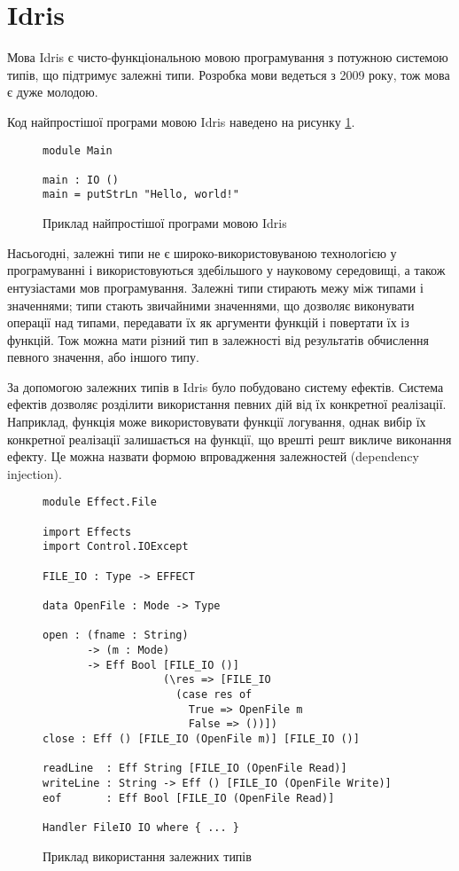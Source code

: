 \documentclass[main.tex]{subfiles}
\begin{document}
\section{Idris}\label{sec:idris}

Мова Idris\cite{idris} є чисто-функціональною мовою програмування з потужною системою типів, що підтримує залежні типи. Розробка мови ведеться з 2009 року\cite{idris:first-release}, тож мова є дуже молодою.

Код найпростішої програми мовою Idris наведено на рисунку \ref{example:idris}.

\begin{figure}[h]
  \centering
  \begin{BVerbatim}
module Main

main : IO ()
main = putStrLn "Hello, world!"
  \end{BVerbatim}
  \caption{Приклад найпростішої програми мовою Idris}\label{example:idris}
\end{figure}

Насьогодні, залежні типи не є широко-використовуваною технологією у програмуванні і використовуються здебільшого у науковому середовищі, а також ентузіастами мов програмування. Залежні типи стирають межу між типами і значеннями; типи стають звичайними значеннями, що дозволяє виконувати операції над типами, передавати їх як аргументи функцій і повертати їх із функцій. Тож можна мати різний тип в залежності від результатів обчислення певного значення, або іншого типу.

За допомогою залежних типів в Idris було побудовано систему ефектів. Система ефектів дозволяє розділити використання певних дій від їх конкретної реалізації. Наприклад, функція може використовувати функції логування, однак вибір їх конкретної реалізації залишається на функції, що врешті решт викличе виконання ефекту. Це можна назвати формою впровадження залежностей (dependency injection). 

\begin{figure}%
  \centering
  \begin{BVerbatim}
module Effect.File

import Effects
import Control.IOExcept

FILE_IO : Type -> EFFECT

data OpenFile : Mode -> Type

open : (fname : String)
       -> (m : Mode)
       -> Eff Bool [FILE_IO ()]
                   (\res => [FILE_IO
                     (case res of
                       True => OpenFile m
                       False => ())])
close : Eff () [FILE_IO (OpenFile m)] [FILE_IO ()]

readLine  : Eff String [FILE_IO (OpenFile Read)]
writeLine : String -> Eff () [FILE_IO (OpenFile Write)]
eof       : Eff Bool [FILE_IO (OpenFile Read)]

Handler FileIO IO where { ... }
  \end{BVerbatim}
  \caption{Приклад використання залежних типів}\label{idris:dependent-types}
\end{figure}
\end{document}
